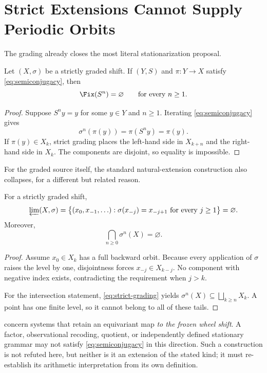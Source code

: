 \section{Strict Extensions Cannot Supply Periodic Orbits}
\label{sec:extension}

The grading already closes the most literal stationarization proposal.

\begin{theorem}
\label{thm:extension}
Let $(X,\sigma)$ be a strictly graded shift.
If $(Y,S)$ and $\pi:Y\to X$ satisfy \eqref{eq:semiconjugacy}, then
\begin{equation}
  \Fix(S^n)=\varnothing
  \qquad\text{for every }n\geq1.
\end{equation}
\end{theorem}

\begin{proof}
Suppose $S^ny=y$ for some $y\in Y$ and $n\geq1$.  Iterating
\eqref{eq:semiconjugacy} gives
\[
  \sigma^n(\pi(y))=\pi(S^ny)=\pi(y).
\]
If $\pi(y)\in X_k$, strict grading places the left-hand side in $X_{k+n}$
and the right-hand side in $X_k$.  The components are disjoint, so equality
is impossible.
\end{proof}

For the graded source itself, the standard natural-extension construction
also collapses, for a different but related reason.

\begin{proposition}
\label{prop:inverse-limit}
For a strictly graded shift,
\begin{equation}
 \varprojlim(X,\sigma)
 =\bigl\{(x_0,x_{-1},\ldots):
     \sigma(x_{-j})=x_{-j+1}\text{ for every }j\geq1\bigr\}
 =\varnothing.
\end{equation}
Moreover,
\begin{equation}
  \bigcap_{n\geq0}\sigma^n(X)=\varnothing.
\end{equation}
\end{proposition}

\begin{proof}
Assume $x_0\in X_k$ has a full backward orbit.  Because every application of
$\sigma$ raises the level by one, disjointness forces
$x_{-j}\in X_{k-j}$.  No component with negative index exists, contradicting
the requirement when $j>k$.

For the intersection statement, \eqref{eq:strict-grading} yields
$\sigma^n(X)\subseteq\bigsqcup_{k\geq n}X_k$.  A point has one finite level,
so it cannot belong to all of these tails.
\end{proof}

\begin{remark}[Scope]
\label{rem:extension-scope}
 concern systems that retain an
equivariant map \emph{to the frozen wheel shift}.  A factor, observational
recoding, quotient, or independently defined stationary grammar may not
satisfy \eqref{eq:semiconjugacy} in this direction.  Such a construction is
not refuted here, but neither is it an extension of the stated kind; it must
re-establish its arithmetic interpretation from its own definition.
\end{remark}
